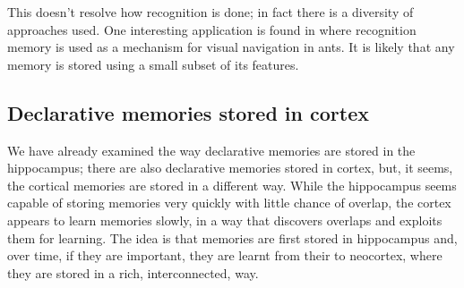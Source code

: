 \documentclass[11pt,a4paper]{scrartcl}
\begin{document}
This doesn't resolve how recognition is done; in fact there is a
diversity of approaches used. One interesting application is found in
\cite{BaddeleyEtAl2012a} where recognition memory is used as a
mechanism for visual navigation in ants. It is likely that any memory
is stored using a small subset of its features.

\subsection*{Declarative memories stored in cortex}

We have already examined the way declarative memories are stored in
the hippocampus; there are also declarative memories stored in cortex,
but, it seems, the cortical memories are stored in a different
way. While the hippocampus seems capable of storing memories very
quickly with little chance of overlap, the cortex appears to learn
memories slowly, in a way that discovers overlaps and exploits them
for learning. The idea is that memories are first stored in
hippocampus and, over time, if they are important, they are learnt
from their to neocortex, where they are stored in a rich,
interconnected, way.
\end{document}
